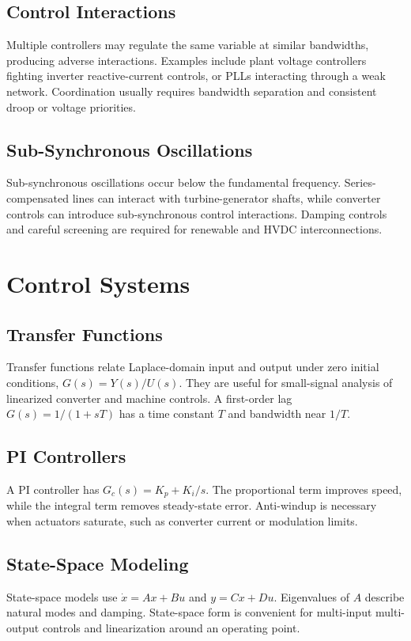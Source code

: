 \documentclass[11pt]{article}
\begin{document}
\subsection{Control Interactions}
Multiple controllers may regulate the same variable at similar bandwidths, producing adverse interactions. Examples include plant voltage controllers fighting inverter reactive-current controls, or PLLs interacting through a weak network. Coordination usually requires bandwidth separation and consistent droop or voltage priorities.

\subsection{Sub-Synchronous Oscillations}
Sub-synchronous oscillations occur below the fundamental frequency. Series-compensated lines can interact with turbine-generator shafts, while converter controls can introduce sub-synchronous control interactions. Damping controls and careful screening are required for renewable and HVDC interconnections.

\section{Control Systems}
\subsection{Transfer Functions}
Transfer functions relate Laplace-domain input and output under zero initial conditions, $G(s)=Y(s)/U(s)$. They are useful for small-signal analysis of linearized converter and machine controls. A first-order lag $G(s)=1/(1+sT)$ has a time constant $T$ and bandwidth near $1/T$.

\subsection{PI Controllers}
A PI controller has $G_c(s)=K_p+K_i/s$. The proportional term improves speed, while the integral term removes steady-state error. Anti-windup is necessary when actuators saturate, such as converter current or modulation limits.

\subsection{State-Space Modeling}
State-space models use $\dot{x}=Ax+Bu$ and $y=Cx+Du$. Eigenvalues of $A$ describe natural modes and damping. State-space form is convenient for multi-input multi-output controls and linearization around an operating point.
\end{document}
